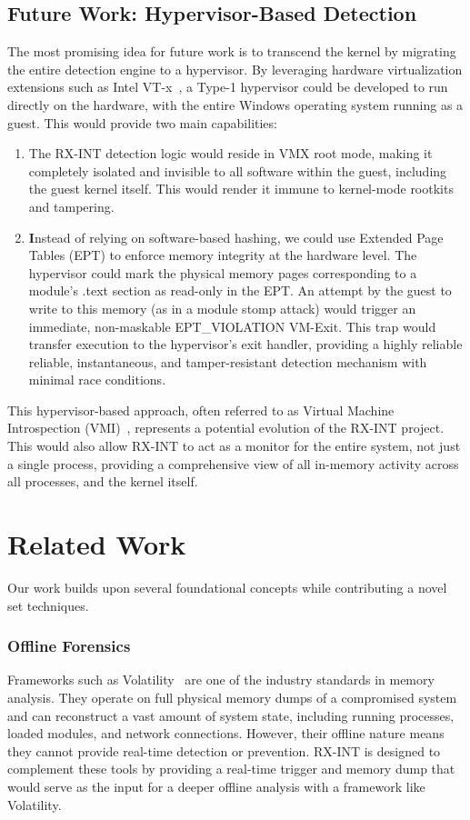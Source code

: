 \documentclass[journal]{IEEEtran}
\begin{document}
\subsection{Future Work: Hypervisor-Based Detection}
The most promising idea for future work is to transcend the kernel by migrating the entire detection engine to a hypervisor. By leveraging hardware virtualization extensions such as Intel VT-x~\cite{IntelVTX}, a Type-1 hypervisor could be developed to run directly on the hardware, with the entire Windows operating system running as a guest.
This would provide two main capabilities:
\begin{enumerate}
\item The RX-INT detection logic would reside in VMX root mode, making it completely isolated and invisible to all software within the guest, including the guest kernel itself. This would render it immune to kernel-mode rootkits and tampering.
\item \textbf Instead of relying on software-based hashing, we could use Extended Page Tables (EPT) to enforce memory integrity at the hardware level. The hypervisor could mark the physical memory pages corresponding to a module's .text section as read-only in the EPT. An attempt by the guest to write to this memory (as in a module stomp attack) would trigger an immediate, non-maskable EPT\_VIOLATION VM-Exit. This trap would transfer execution to the hypervisor's exit handler, providing a highly reliable reliable, instantaneous, and tamper-resistant detection mechanism with minimal race conditions.
\end{enumerate}
This hypervisor-based approach, often referred to as Virtual Machine Introspection (VMI)~\cite{Garfinkel2003_VMI}, represents a potential evolution of the RX-INT project. This would also allow RX-INT to act as a monitor for the entire system, not just a single process, providing a comprehensive view of all in-memory activity across all processes, and the kernel itself.

\section{Related Work}\label{sec:related_work}
Our work builds upon several foundational concepts while contributing a novel set techniques.
\subsubsection{Offline Forensics}
Frameworks such as Volatility~\cite{Ligh2005_Volatility} are one of the industry standards in memory analysis. They operate on full physical memory dumps of a compromised system and can reconstruct a vast amount of system state, including running processes, loaded modules, and network connections. However, their offline nature means they cannot provide real-time detection or prevention. RX-INT is designed to complement these tools by providing a real-time trigger and memory dump that would serve as the input for a deeper offline analysis with a framework like Volatility.
\end{document}
